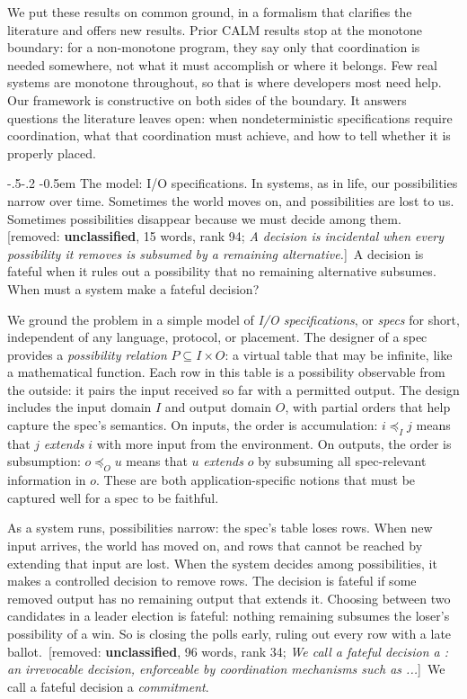 \documentclass[sigconf]{cidr-2027}
\makeatletter
\theoremstyle{remark}
\renewcommand\paragraph{\@startsection{paragraph}{4}{\z@}%
  {-.5\baselineskip \@plus -2\p@ \@minus -.2\p@}%
  {-0.5em}%
  {\normalfont\bfseries}}
\newcommand{\InputOrd}{\preceq_I}
\newcommand{\OutputOrd}{\preceq_O}
\newcommand{\commitment}{commitment\xspace}
\newcommand{\inrel}{extends\xspace}          %
\newcommand{\outrel}{extends\xspace}          %
\newcommand{\spectype}[1][]{I/O specification#1\xspace}
\newcommand{\Spectype}[1][]{I/O specification#1\xspace}
\newif\ifshowrv \showrvfalse
\newcommand{\rv}[1]{\ifshowrv\textsuperscript{\textcolor{magenta}{\textbf{R#1}}}\fi}
\newcommand{\removednote}[1]{{\color{cutred}\footnotesize\,[removed: #1]\,}}
\makeatother
\begin{document}
We put these results on common ground, in a formalism that clarifies the
literature and offers new results. Prior CALM results stop at the monotone
boundary: for a non-monotone program, they say only that coordination is needed
somewhere, not what it must accomplish or where it belongs. Few real systems
are monotone throughout, so that is where developers most need help. Our
framework is constructive on both sides of the boundary. It answers questions
the literature leaves open: when nondeterministic specifications require
coordination, what that coordination must achieve, and how to tell whether it is
properly placed.

\paragraph{The model: \Spectype[s].}
In systems, as in life, our possibilities narrow over time. Sometimes the world
moves on, and possibilities are lost to us. Sometimes possibilities disappear
because we must decide among them. \removednote{\textbf{unclassified}, 15 words, rank 94; \textit{A decision is incidental when every possibility it removes is subsumed by a remaining alternative.}} \textcolor{newblue}{A
decision is fateful when it rules out a possibility that no remaining alternative
subsumes.\rv{6} When must a system make a fateful decision?}

We ground the problem in a simple model of \emph{\spectype[s]}, or \emph{specs}
for short, independent of any language, protocol, or placement. The designer of
a spec provides a \emph{possibility relation} $P\subseteq I\times O$: a virtual
table that may be infinite, like a mathematical function. Each row in this table
is a possibility observable from the outside: it pairs the input received so far
with a permitted output. The design includes the input domain $I$ and output domain $O$,
with partial orders that help capture the spec's semantics. On inputs, the order
is accumulation: $i\InputOrd j$ means that $j$ \emph{\inrel} $i$ with more input
from the environment. \textcolor{newblue}{On outputs, the order is subsumption: $o\OutputOrd u$
means that  $u$ \emph{\outrel} $o$ by subsuming\rv{6} all spec-relevant information in
$o$.} These are both application-specific notions that must be captured well for
a spec to be faithful.

As a system runs, possibilities narrow: the spec's table loses rows. When new
input arrives, the world has moved on, and rows that cannot be reached by
extending that input are lost. When the system decides among possibilities, it
makes a controlled decision to remove rows. \textcolor{newblue}{The decision is fateful if some
removed output has no remaining output that \outrel it.} \textcolor{newblue}{Choosing between two candidates in a leader election is fateful: nothing
remaining subsumes\rv{6} the loser's possibility of a win.} \textcolor{newblue}{So is closing the polls early,
ruling out every row with a late ballot.} \removednote{\textbf{unclassified}, 96 words, rank 34; \textit{We call a fateful decision a : an irrevocable decision, enforceable by coordination mechanisms such as ...}} \textcolor{newblue}{We call a fateful decision a
\emph{\commitment}.}
\end{document}
